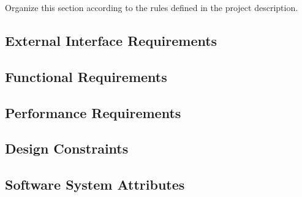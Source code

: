 Organize this section according to the rules defined in the project description. \\ 

\subsection{External Interface Requirements}

\subsection{Functional Requirements}

\subsection{Performance Requirements}

\subsection{Design Constraints}

\subsection{Software System Attributes}
	
